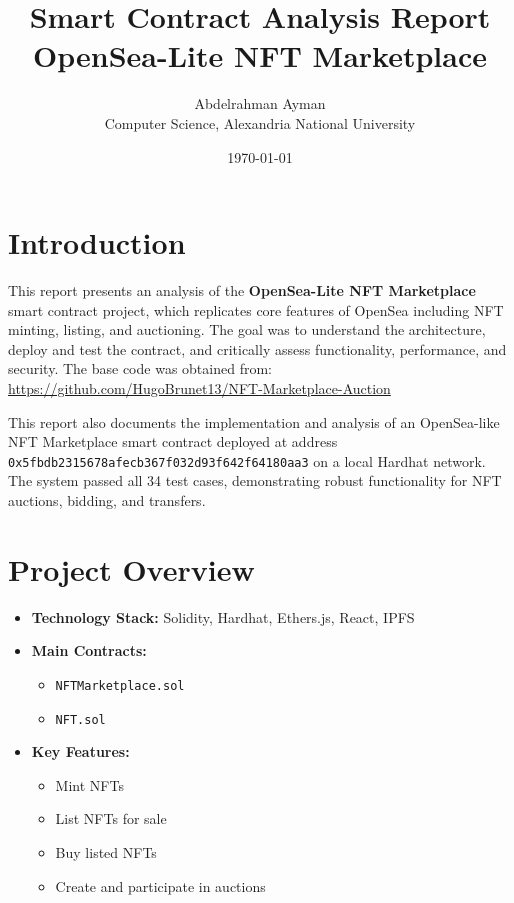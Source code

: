 \documentclass{article}
\title{Smart Contract Analysis Report \\ \large OpenSea-Lite NFT Marketplace}
\author{Abdelrahman Ayman \\ Computer Science, Alexandria National University}
\date{\today}
\begin{document}
\maketitle

\section*{Introduction}
This report presents an analysis of the \textbf{OpenSea-Lite NFT Marketplace} smart contract project, which replicates core features of OpenSea including NFT minting, listing, and auctioning. The goal was to understand the architecture, deploy and test the contract, and critically assess functionality, performance, and security. The base code was obtained from: \\
\url{https://github.com/HugoBrunet13/NFT-Marketplace-Auction}

This report also documents the implementation and analysis of an OpenSea-like NFT Marketplace smart contract deployed at address \texttt{0x5fbdb2315678afecb367f032d93f642f64180aa3} on a local Hardhat network. The system passed all 34 test cases, demonstrating robust functionality for NFT auctions, bidding, and transfers.

\section*{Project Overview}
\begin{itemize}
  \item \textbf{Technology Stack:} Solidity, Hardhat, Ethers.js, React, IPFS
  \item \textbf{Main Contracts:}
    \begin{itemize}
      \item \texttt{NFTMarketplace.sol}
      \item \texttt{NFT.sol}
    \end{itemize}
  \item \textbf{Key Features:}
    \begin{itemize}
      \item Mint NFTs
      \item List NFTs for sale
      \item Buy listed NFTs
      \item Create and participate in auctions
    \end{itemize}
\end{itemize}
\end{document}

